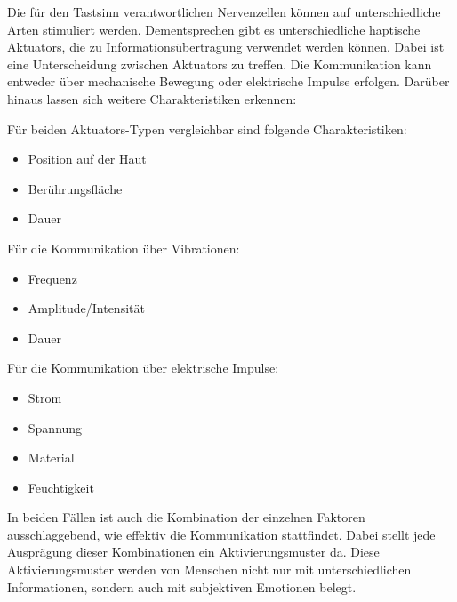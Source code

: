\documentclass{llncs}					%
\begin{document}
Die für den Tastsinn verantwortlichen Nervenzellen können auf unterschiedliche Arten stimuliert werden. Dementsprechen gibt es unterschiedliche haptische \glspl{Aktuator}, die zu Informationsübertragung verwendet werden können. Dabei ist eine Unterscheidung zwischen \glspl{Aktuator} zu treffen. Die Kommunikation kann entweder über mechanische Bewegung oder elektrische Impulse erfolgen. Darüber hinaus lassen sich weitere Charakteristiken erkennen:

Für beiden \glspl{Aktuator}-Typen vergleichbar sind folgende Charakteristiken:
\begin{itemize}
	\item Position auf der Haut
	
	\item Berührungsfläche
	
	\item Dauer
\end{itemize}

Für die Kommunikation über Vibrationen\cite{doi:10.1518/001872008X250638}:
\begin{itemize}
	\item Frequenz
	\item Amplitude/Intensität %
	\item Dauer
\end{itemize}

Für die Kommunikation über elektrische Impulse\cite[S.~4]{68204}:
\begin{itemize}
	\item Strom
	\item Spannung
	\item Material
	\item Feuchtigkeit
\end{itemize}

In beiden Fällen ist auch die Kombination der einzelnen Faktoren ausschlaggebend, wie effektiv die Kommunikation stattfindet. Dabei stellt jede Ausprägung dieser Kombinationen ein Aktivierungsmuster da. Diese Aktivierungsmuster werden von Menschen nicht nur mit unterschiedlichen Informationen, sondern auch mit subjektiven Emotionen belegt\cite{5444662}.%
\end{document}
